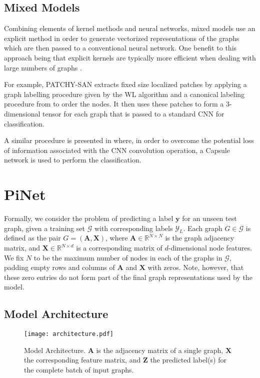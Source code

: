 \documentclass{article}
\renewcommand{\vec}[1]{\mathbf{#1}}
\theoremstyle{definition}
\newcommand{\Real}[1]{\mathbb{R}^{#1}}
\begin{document}
\subsection{Mixed Models}

Combining elements of kernel methods and neural networks, mixed models use an explicit method in order to generate vectorized representations of the graphs which are then passed to a conventional neural network. One benefit to this approach being that explicit kernels are typically more efficient when dealing with large numbers of graphs \cite{Kriege2015}.

For example, PATCHY-SAN \cite{Niepert2016} extracts fixed size localized patches by applying a graph labelling procedure given by the WL algorithm \cite{Weisfeiler1968} and a canonical labeling procedure from \cite{Mckay2013} to order the nodes. It then uses these patches to form a 3-dimensional tensor for each graph that is passed to a standard CNN for classification.

A similar procedure is presented in \cite{Daniel2019} where, in order to overcome the potential loss of information associated with the CNN convolution operation, a Capsule network is used to perform the classification. 


\section{PiNet}

Formally, we consider the problem of predicting a label $\vec{y}$ for an unseen test graph, given a training set $\mathcal{G}$ with corresponding labels $\mathcal{Y}_L$. Each graph $G \in \mathcal{G}$ is defined as the pair $G = (\vec{A}, \vec{X})$, where $\vec{A} \in \Real{N \times N}$ is the graph adjacency matrix, and $\vec{X} \in \Real{N \times d}$ is a corresponding matrix of $d$-dimensional node features. We fix $N$ to be the maximum number of nodes in each of the graphs in $\mathcal{G}$, padding empty rows and columns of $\vec{A}$ and $\vec{X}$ with zeros. Note, however, that these zero entries do not form part of the final graph representations used by the model.

\subsection{Model Architecture}

\begin{figure}[htb]
  \centering
  \texttt{[image: architecture.pdf]}
  \caption{Model Architecture. $\vec{A}$ is the  adjacency matrix of a single graph, $\vec{X}$ the corresponding feature matrix, and $\vec{Z}$ the predicted label(s) for the complete batch of input graphs.}
  \label{fig:architecture}
\end{figure}
\end{document}
